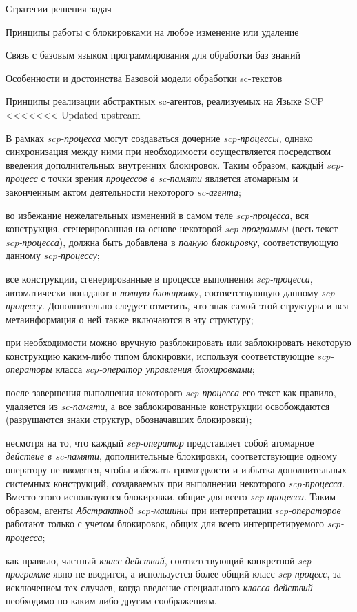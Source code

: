 \begin{frame}{Стратегии решения задач}
\begin{frame}{\large Принципы работы с блокировками на любое изменение или удаление}
\begin{frame}{Связь с базовым языком программирования для обработки баз
знаний}
\begin{frame}{Особенности и достоинства Базовой модели обработки sc-текстов}
\begin{frame}{\large Принципы реализации абстрактных sc-агентов, реализуемых на Языке SCP}
<<<<<<< Updated upstream
\begin{textitemize}
    \item В рамках \textit{scp-процесса} могут создаваться дочерние \textit{scp-процессы}, однако синхронизация между ними при необходимости осуществляется посредством введения дополнительных внутренних блокировок. Таким образом, каждый \textit{scp-процесс} с точки зрения \textit{процессов в sc-памяти} является атомарным и законченным актом деятельности некоторого \textit{sc-агента};
\item во избежание нежелательных изменений в самом теле \textit{scp-процесса}, вся конструкция, сгенерированная на основе некоторой \textit{scp-программы} (весь текст \textit{scp-процесса}), должна быть добавлена в \textit{полную блокировку}, соответствующую данному \textit{scp-процессу};
\item все конструкции, сгенерированные в процессе выполнения
\textit{scp-процесса}, автоматически попадают в \textit{полную 	блокировку}, соответствующую данному \textit{scp-процессу}. Дополнительно следует отметить, что знак самой этой структуры и вся метаинформация о ней также включаются в эту структуру;
\item при необходимости можно вручную разблокировать или заблокировать некоторую конструкцию каким-либо типом блокировки, используя соответствующие \textit{scp-операторы} класса \textit{scp-оператор управления блокировками};
\item после завершения выполнения некоторого \textit{scp-процесса} его текст как правило, удаляется из \textit{\mbox{sc-памяти}}, а все заблокированные конструкции освобождаются (разрушаются знаки структур, обозначавших блокировки);
\item несмотря на то, что каждый \textit{scp-оператор} представляет собой атомарное \textit{действие в sc-памяти}, дополнительные блокировки, соответствующие одному оператору не вводятся, чтобы избежать громоздкости и избытка дополнительных системных конструкций, создаваемых при выполнении некоторого \textit{scp-процесса}. Вместо этого используются блокировки, общие для всего \textit{scp-процесса}. Таким образом, агенты \textit{Абстрактной scp-машины} при интерпретации \textit{scp-операторов} работают только с учетом блокировок, общих для всего интерпретируемого \textit{scp-процесса};
\item как правило, частный \textit{класс действий}, соответствующий конкретной \textit{scp-программе} явно не вводится, а используется более общий класс \textit{scp-процесс}, за исключением тех случаев, когда введение специального \textit{класса действий} необходимо по каким-либо другим соображениям.

\end{textitemize}
\end{frame}
\end{frame}
\end{frame}
\end{frame}
\end{frame}
